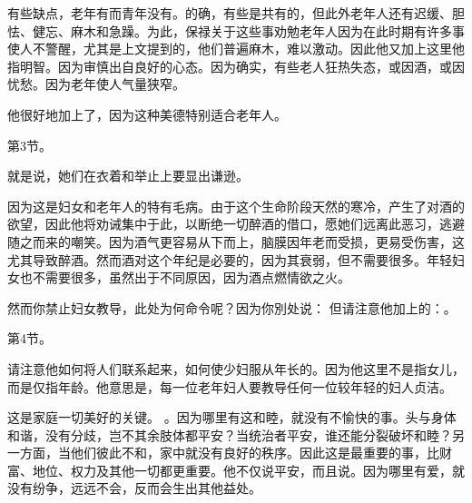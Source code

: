 有些缺点，老年有而青年没有。的确，有些是共有的，但此外老年人还有迟缓、胆怯、健忘、麻木和急躁。为此，保禄关于这些事劝勉老年人因为在此时期有许多事使人不警醒，尤其是上文提到的，他们普遍麻木，难以激动。因此他又加上这里他指明智。因为审慎出自良好的心态。因为确实，有些老人狂热失态，或因酒，或因忧愁。因为老年使人气量狭窄。\par

\par

他很好地加上了，因为这种美德特别适合老年人。\par

第3节。 \par

就是说，她们在衣着和举止上要显出谦逊。\par

\par

因为这是妇女和老年人的特有毛病。由于这个生命阶段天然的寒冷，产生了对酒的欲望，因此他将劝诫集中于此，以断绝一切醉酒的借口，愿她们远离此恶习，逃避随之而来的嘲笑。因为酒气更容易从下而上，脑膜因年老而受损，更易受伤害，这尤其导致醉酒。然而酒对这个年纪是必要的，因为其衰弱，但不需要很多。年轻妇女也不需要很多，虽然出于不同原因，因为酒点燃情欲之火。\par

\par

然而你禁止妇女教导，此处为何命令呢？因为你別处说：  但请注意他加上的：。\par

第4节。 \par

请注意他如何将人们联系起来，如何使少妇服从年长的。因为他这里不是指女儿，而是仅指年龄。他意思是，每一位老年妇人要教导任何一位较年轻的妇人贞洁。\par

\par

这是家庭一切美好的关键。 。因为哪里有这和睦，就没有不愉快的事。头与身体和谐，没有分歧，岂不其余肢体都平安？当统治者平安，谁还能分裂破坏和睦？另一方面，当他们彼此不和，家中就没有良好的秩序。因此这是最重要的事，比财富、地位、权力及其他一切都更重要。他不仅说平安，而且说。因为哪里有爱，就没有纷争，远远不会，反而会生出其他益处。\par

